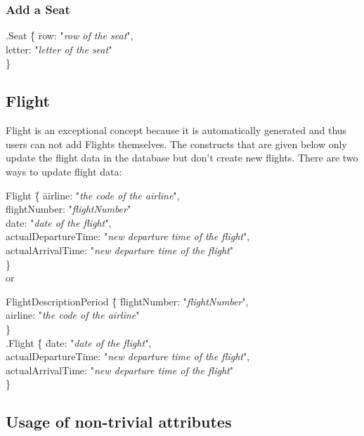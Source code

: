 \documentclass[a4paper,11pt]{article}
\begin{document}
\subsubsection*{Add a Seat}
\begin{tabbing}
.Seat \= \{ \= row: "\textit{row of the seat}", \\
	\> \> letter: "\textit{letter of the seat}" \\
\> \} \\
\end{tabbing}

\subsection*{Flight}
Flight is an exceptional concept because it is automatically generated and thus users can not add Flights themselves. The constructs that are given below only update the flight data in the database but don’t create new flights.
There are two ways to update flight data:

\begin{tabbing}
Flight \= \{ \= airline: "\textit{the code of the airline}", \\
	\> \> flightNumber: "\textit{flightNumber}" \\
	\> \> date: "\textit{date of the flight}", \\
	\> \> actualDepartureTime: "\textit{new departure time of the flight}", \\
	\> \> actualArrivalTime: "\textit{new departure time of the flight}" \\
\> \} \\

or
\end{tabbing}

\begin{tabbing}
FlightDescriptionPeriod \= \{ \= flightNumber: "\textit{flightNumber}", \\
	\> \> airline: "\textit{the code of the airline}" \\
\> \} \\
\> .Flight \= \{ \= date: "\textit{date of the flight}", \\
	\> \> actualDepartureTime: "\textit{new departure time of the flight}", \\
	\> \> actualArrivalTime: "\textit{new departure time of the flight}" \\
\> \} \\
\end{tabbing}


\subsection*{Usage of non-trivial attributes}
\end{document}
